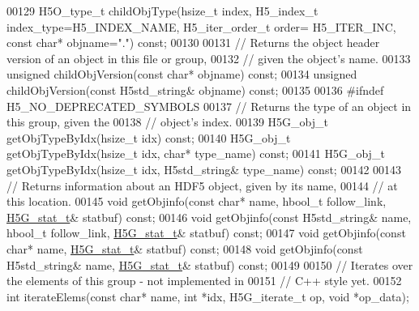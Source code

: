 \begin{DoxyCode}
00129         H5O\_type\_t childObjType(hsize\_t index, H5\_index\_t index\_type=H5\_INDEX\_NAME, H5\_iter\_order\_t order=
      H5\_ITER\_INC, \textcolor{keyword}{const} \textcolor{keywordtype}{char}* objname=\textcolor{stringliteral}{"."}) \textcolor{keyword}{const};
00130 
00131         \textcolor{comment}{// Returns the object header version of an object in this file or group,}
00132         \textcolor{comment}{// given the object's name.}
00133         \textcolor{keywordtype}{unsigned} childObjVersion(\textcolor{keyword}{const} \textcolor{keywordtype}{char}* objname) \textcolor{keyword}{const};
00134         \textcolor{keywordtype}{unsigned} childObjVersion(\textcolor{keyword}{const} H5std\_string& objname) \textcolor{keyword}{const};
00135 
00136 \textcolor{preprocessor}{#ifndef H5\_NO\_DEPRECATED\_SYMBOLS}
00137         \textcolor{comment}{// Returns the type of an object in this group, given the}
00138         \textcolor{comment}{// object's index.}
00139         H5G\_obj\_t getObjTypeByIdx(hsize\_t idx) \textcolor{keyword}{const};
00140         H5G\_obj\_t getObjTypeByIdx(hsize\_t idx, \textcolor{keywordtype}{char}* type\_name) \textcolor{keyword}{const};
00141         H5G\_obj\_t getObjTypeByIdx(hsize\_t idx, H5std\_string& type\_name) \textcolor{keyword}{const};
00142 
00143         \textcolor{comment}{// Returns information about an HDF5 object, given by its name,}
00144         \textcolor{comment}{// at this location.}
00145         \textcolor{keywordtype}{void} getObjinfo(\textcolor{keyword}{const} \textcolor{keywordtype}{char}* name, hbool\_t follow\_link, \hyperlink{struct_h5_g__stat__t}{H5G\_stat\_t}& statbuf) \textcolor{keyword}{const};
00146         \textcolor{keywordtype}{void} getObjinfo(\textcolor{keyword}{const} H5std\_string& name, hbool\_t follow\_link, 
      \hyperlink{struct_h5_g__stat__t}{H5G\_stat\_t}& statbuf) \textcolor{keyword}{const};
00147         \textcolor{keywordtype}{void} getObjinfo(\textcolor{keyword}{const} \textcolor{keywordtype}{char}* name, \hyperlink{struct_h5_g__stat__t}{H5G\_stat\_t}& statbuf) \textcolor{keyword}{const};
00148         \textcolor{keywordtype}{void} getObjinfo(\textcolor{keyword}{const} H5std\_string& name, \hyperlink{struct_h5_g__stat__t}{H5G\_stat\_t}& statbuf) \textcolor{keyword}{const};
00149 
00150         \textcolor{comment}{// Iterates over the elements of this group - not implemented in}
00151         \textcolor{comment}{// C++ style yet.}
00152         \textcolor{keywordtype}{int} iterateElems(\textcolor{keyword}{const} \textcolor{keywordtype}{char}* name, \textcolor{keywordtype}{int} *idx, H5G\_iterate\_t op, \textcolor{keywordtype}{void} *op\_data);

\end{DoxyCode}
